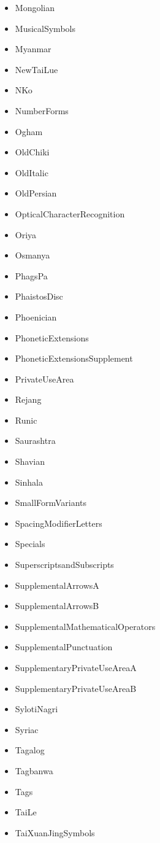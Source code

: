 ﻿\documentclass{article}
\newenvironment{itemlist}{%
  \begin{itemize}
	\setlength{\itemsep}{0pt}
	\setlength{\parsep}{0pt}
	\setlength{\topsep}{0pt}
	\setlength{\partopsep}{0pt}
	\setlength{\parskip}{0pt}
	\setlength{\labelsep}{5pt}}%
{
  \end{itemize}}
\begin{document}
\begin{multicols}{2}
\begin{itemlist}
				\item Mongolian
				\item MusicalSymbols
				\item Myanmar
				\item NewTaiLue
				\item NKo
				\item NumberForms
				\item Ogham
				\item OldChiki
				\item OldItalic
				\item OldPersian
				\item OpticalCharacterRecognition
				\item Oriya
				\item Osmanya
				\item PhagsPa
				\item PhaistosDisc
				\item Phoenician
				\item PhoneticExtensions
				\item PhoneticExtensionsSupplement
				\item PrivateUseArea
				\item Rejang
				\item Runic
				\item Saurashtra
				\item Shavian
				\item Sinhala
				\item SmallFormVariants
				\item SpacingModifierLetters
				\item Specials
				\item SuperscriptsandSubscripts
				\item SupplementalArrowsA
				\item SupplementalArrowsB
				\item SupplementalMathematicalOperators
				\item SupplementalPunctuation
				\item SupplementaryPrivateUseAreaA
				\item SupplementaryPrivateUseAreaB
				\item SylotiNagri
				\item Syriac
				\item Tagalog
				\item Tagbanwa
				\item Tags
				\item TaiLe
				\item TaiXuanJingSymbols

\end{itemlist}
\end{multicols}
\end{document}
